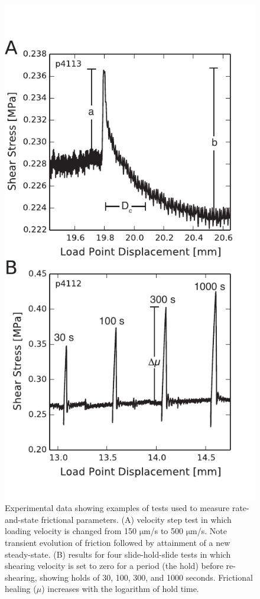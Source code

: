 \begin{figure}
\includegraphics{chap_granular_stiffness/Fig1.pdf}
\caption{\label{fig:tests}
Experimental data showing examples of tests used to measure rate-and-state frictional parameters. (A) velocity step test in which loading velocity is changed from 150 $\mathrm{\mu}$m/s to 500 $\mathrm{\mu}$m/s. Note transient evolution of friction followed by attainment of a new steady-state. (B) results for four slide-hold-slide tests in which shearing velocity is set to zero for a period (the hold) before re-shearing, showing holds of 30, 100, 300, and 1000 seconds. Frictional healing ({}$\mu$) increases with the logarithm of hold time.}
\end{figure}

